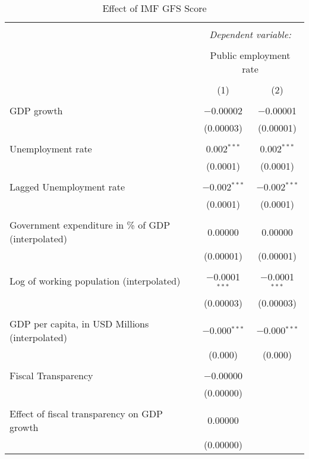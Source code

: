 
\begin{table}[!htbp] \centering 
  \caption{Effect of IMF GFS Score} 
  \label{} 
\begin{tabular}{@{\extracolsep{5pt}}lcc} 
\\[-1.8ex]\hline 
\hline \\[-1.8ex] 
 & \multicolumn{2}{c}{\textit{Dependent variable:}} \\ 
\cline{2-3} 
\\[-1.8ex] & \multicolumn{2}{c}{Public employment rate} \\ 
\\[-1.8ex] & (1) & (2)\\ 
\hline \\[-1.8ex] 
 GDP growth & $-$0.00002 & $-$0.00001 \\ 
  & (0.00003) & (0.00001) \\ 
  & & \\ 
 Unemployment rate & 0.002$^{***}$ & 0.002$^{***}$ \\ 
  & (0.0001) & (0.0001) \\ 
  & & \\ 
 Lagged Unemployment rate & $-$0.002$^{***}$ & $-$0.002$^{***}$ \\ 
  & (0.0001) & (0.0001) \\ 
  & & \\ 
 Government expenditure in \% of GDP (interpolated) & 0.00000 & 0.00000 \\ 
  & (0.00001) & (0.00001) \\ 
  & & \\ 
 Log of working population (interpolated) & $-$0.0001$^{***}$ & $-$0.0001$^{***}$ \\ 
  & (0.00003) & (0.00003) \\ 
  & & \\ 
 GDP per capita, in USD Millions (interpolated) & $-$0.000$^{***}$ & $-$0.000$^{***}$ \\ 
  & (0.000) & (0.000) \\ 
  & & \\ 
 Fiscal Transparency & $-$0.00000 &  \\ 
  & (0.00000) &  \\ 
  & & \\ 
 Effect of fiscal transparency on GDP growth & 0.00000 &  \\ 
  & (0.00000) &  \\ 

\end{tabular}
\end{table}
